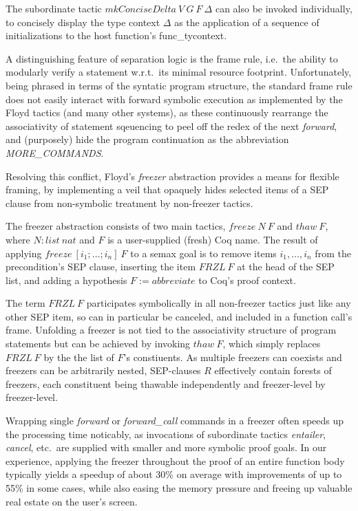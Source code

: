 \documentclass[12pt,fleqn,openany,oneside,showtrims]{memoir}
\begin{document}
\label{refcard:mkConciseDelta}
The subordinate tactic $\mathit{mkConciseDelta}\ V\ G\ F\ \Delta$ can
also be invoked individually, to concisely display the type context $\Delta$
as the application of a sequence of initializations
to the host function's func\_tycontext.

\label{freezer}
A distinguishing feature of separation logic is the frame rule,
i.e.~the ability to modularly verify a statement w.r.t.~its minimal
resource footprint. Unfortunately, being phrased in terms of the
syntatic program structure, the standard frame rule does not easily
interact with forward symbolic execution as implemented by the Floyd
tactics (and many other systems), as these continuously rearrange the
associativity of statement sqeuencing to peel off the redex of the
next \emph{forward}, and (purposely) hide the program continuation as
the abbreviation \emph{MORE\_COMMANDS}.

Resolving this conflict, Floyd's \emph{freezer} abstraction provides a
means for flexible framing, by implementing a veil that opaquely hides
selected items of a SEP clause from non-symbolic treatment by
non-freezer tactics.

The freezer abstraction consists of two main tactics, $\mathit{freeze}\
N\ F$ and $\mathit{thaw}\ F$, where $N:\mathit{list\ nat}$ and $F$ is
a user-supplied (fresh) Coq name. The result of applying
$\mathit{freeze}\ [i_1;\ldots;i_n]\ F$ to a semax goal is to remove
items $i_1,\ldots,i_n$ from the precondition's SEP clause, inserting
the item $\mathit{FRZL}\ F$ at the head of the SEP list, and adding a
hypothesis $F := \mathit{abbreviate}$ to Coq's proof context.

The term $\mathit{FRZL}\ F$ participates symbolically in all
non-freezer tactics just like any other SEP item, so can in particular
be canceled, and included in a function call's frame.  Unfolding a
freezer is not tied to the associativity structure of program
statements but can be achieved by invoking $\mathit{thaw}\ F$, which
simply replaces $\mathit{FRZL}\ F$ by the the list of $F$'s
constiuents.  As multiple freezers can coexists and freezers can be
arbitrarily nested, SEP-clauses $R$ effectively contain forests of
freezers, each constituent being thawable independently and
freezer-level by freezer-level.

Wrapping single \emph{forward} or \emph{forward\_call} commands in a
freezer often speeds up the processing time noticably, as invocations
of subordinate tactics \emph{entailer}, \emph{cancel}, etc.~are
supplied with smaller and more symbolic proof goals. In our
experience, applying the freezer throughout the proof of an entire
function body typically yields a speedup of about 30\% on average with
improvements of up to 55\% in some cases, while also easing the memory
pressure and freeing up valuable real estate on the user's screen.
\end{document}
